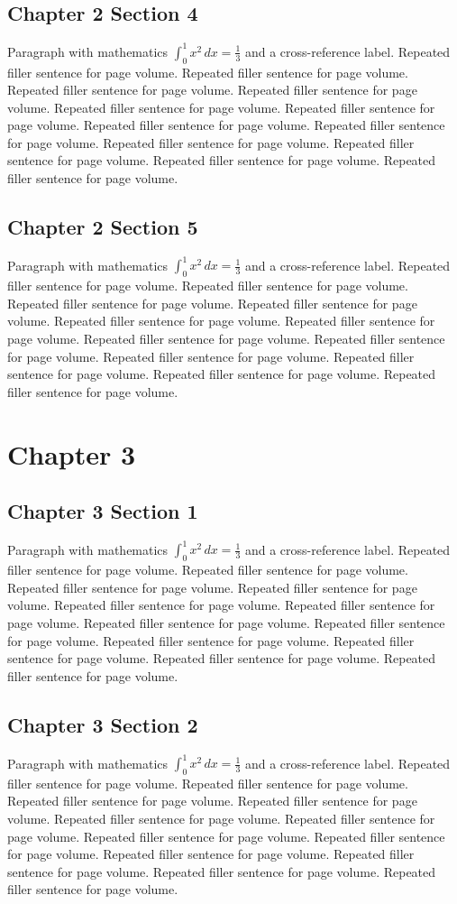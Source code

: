 \documentclass[11pt]{report}
\begin{document}
\section{Chapter 2 Section 4}
Paragraph with mathematics $\int_0^1 x^2\,dx = \frac13$ and a cross-reference label.
\label{sec:2:4}
Repeated filler sentence for page volume. Repeated filler sentence for page volume. Repeated filler sentence for page volume. Repeated filler sentence for page volume. Repeated filler sentence for page volume. Repeated filler sentence for page volume. Repeated filler sentence for page volume. Repeated filler sentence for page volume. Repeated filler sentence for page volume. Repeated filler sentence for page volume. Repeated filler sentence for page volume. Repeated filler sentence for page volume. 
\section{Chapter 2 Section 5}
Paragraph with mathematics $\int_0^1 x^2\,dx = \frac13$ and a cross-reference label.
\label{sec:2:5}
Repeated filler sentence for page volume. Repeated filler sentence for page volume. Repeated filler sentence for page volume. Repeated filler sentence for page volume. Repeated filler sentence for page volume. Repeated filler sentence for page volume. Repeated filler sentence for page volume. Repeated filler sentence for page volume. Repeated filler sentence for page volume. Repeated filler sentence for page volume. Repeated filler sentence for page volume. Repeated filler sentence for page volume. 
\chapter{Chapter 3}
\section{Chapter 3 Section 1}
Paragraph with mathematics $\int_0^1 x^2\,dx = \frac13$ and a cross-reference label.
\label{sec:3:1}
Repeated filler sentence for page volume. Repeated filler sentence for page volume. Repeated filler sentence for page volume. Repeated filler sentence for page volume. Repeated filler sentence for page volume. Repeated filler sentence for page volume. Repeated filler sentence for page volume. Repeated filler sentence for page volume. Repeated filler sentence for page volume. Repeated filler sentence for page volume. Repeated filler sentence for page volume. Repeated filler sentence for page volume. 
\section{Chapter 3 Section 2}
Paragraph with mathematics $\int_0^1 x^2\,dx = \frac13$ and a cross-reference label.
\label{sec:3:2}
Repeated filler sentence for page volume. Repeated filler sentence for page volume. Repeated filler sentence for page volume. Repeated filler sentence for page volume. Repeated filler sentence for page volume. Repeated filler sentence for page volume. Repeated filler sentence for page volume. Repeated filler sentence for page volume. Repeated filler sentence for page volume. Repeated filler sentence for page volume. Repeated filler sentence for page volume. Repeated filler sentence for page volume. 
\end{document}
